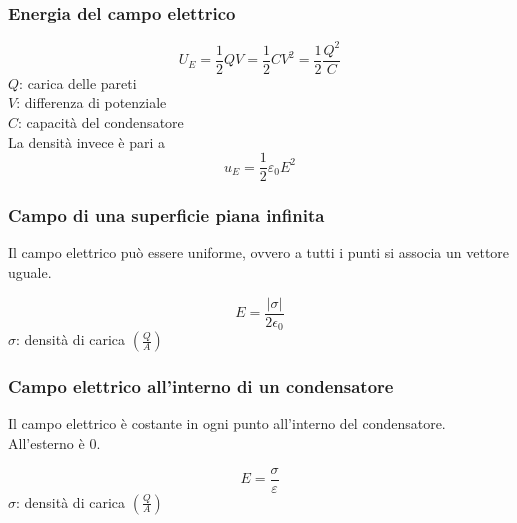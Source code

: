 \subsubsection{Energia del campo elettrico}
\begin{equation*}
U_E = \frac{1}{2}QV = \frac{1}{2}CV^2 = \frac{1}{2}\frac{Q^2}{C}
\end{equation*}
$Q$: carica delle pareti\\
$V$: differenza di potenziale\\
$C$: capacità del condensatore\\ [\baselineskip]

La densità invece è pari a
\begin{equation*}
  u_E = \frac{1}{2}\varepsilon_0E^2
\end{equation*}

\subsubsection{Campo di una superficie piana infinita}
Il campo elettrico può essere uniforme, ovvero a tutti i punti si associa un vettore uguale.
\begin{center}
\end{center}
\begin{equation*}
E = \frac{\left\lvert\sigma\right\rvert}{2\epsilon_0}
\end{equation*}
$\sigma$: densità di carica $\left(\frac{Q}{A}\right)$

\subsubsection{Campo elettrico all'interno di un condensatore}
Il campo elettrico è costante in ogni punto all'interno del condensatore. All'esterno è $0$.
\begin{center}
\end{center}
\begin{equation*}
E = \frac{\sigma}{\varepsilon}
\end{equation*}
$\sigma$: densità di carica $\left(\frac{Q}{A}\right)$

